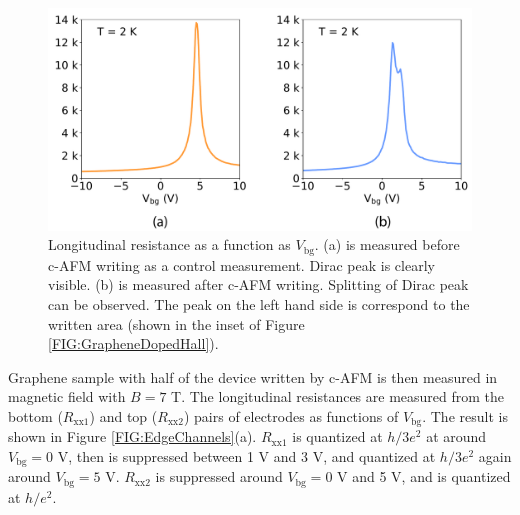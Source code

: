 \documentclass[pdflatex, sectionletters, 12pt]{pittetd}    %
\begin{document}
\begin{figure}[h!]
	\centering
	\includegraphics[width=.75\textwidth]{Drawing/DiracPointSplit.pdf}
	\caption{Longitudinal resistance as a function as $V_\mathrm{bg}$. (a) is measured before c-AFM writing as a control measurement. Dirac peak is clearly visible. (b) is measured after c-AFM writing. Splitting of Dirac peak can be observed. The peak on the left hand side is correspond to the written area (shown in the inset of Figure \ref{FIG:GrapheneDopedHall}).}
	\label{FIG:DiracPointSplit}
\end{figure}

Graphene sample with half of the device written by c-AFM is then measured in magnetic field with $B = 7$ T. The longitudinal resistances are measured from the bottom ($R_\mathrm{xx1}$) and top ($R_\mathrm{xx2}$) pairs of electrodes as functions of $V_\mathrm{bg}$. The result is shown in Figure \ref{FIG:EdgeChannels}(a). $R_\mathrm{xx1}$ is quantized at $h/3e^2$ at around $V_\mathrm{bg} = 0$ V, then is suppressed between 1 V and 3 V, and quantized at $h/3e^2$ again around $V_\mathrm{bg} = 5$ V. $R_\mathrm{xx2}$ is suppressed around $V_\mathrm{bg} = 0$ V and 5 V, and is quantized at $h/e^2$. 
\end{document}
